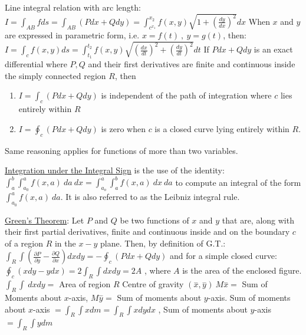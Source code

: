 \documentclass[12pt]{article}
\begin{document}
\begin{flushleft}
	\textbullet \quad Line integral relation with arc length: \linebreak 
	$\displaystyle I = \int_{AB} f ds = \int_{AB} (Pdx + Qdy) = \int_{c^{x_1}}^{x_2} f(x,y) \sqrt{1+ \left( \frac{dy}{dx} \right)^2} dx$ \linebreak 
	\textbullet \quad When $x$ and $y$ are expressed in parametric form, i.e. $x=f(t) \ , \ y=g(t)$, then: $\displaystyle I = \int_c f(x,y) ds = \int_{t_1}^{t_2} f(x,y) \sqrt{\left( \frac{dx}{dt} \right)^2 + \left( \frac{dy}{dt} \right)^2} dt $ \linebreak 
	\textbullet \quad If $Pdx + Qdy$ is an exact differential where $P,Q$ and their first derivatives are finite and continuous inside the simply connected region $R$, then  
	\begin{enumerate}
	\item $\displaystyle I = \int_c \left( Pdx + Qdy \right)$ is independent of the path of integration where $c$ lies entirely within $R$ 
	\item $\displaystyle I = \oint_c \left( Pdx + Qdy \right) $ is zero when $c$ is a closed curve lying entirely within $R$. 
	\end{enumerate} 
	Same reasoning applies for functions of more than two variables. \linebreak 
	
	\textbullet \quad \uline{Integration under the Integral Sign} is the use of the identity: \linebreak 
	$\displaystyle \int_a^b \int_{a_0}^a f(x,a) \ da \ dx = \int_{a_o}^a \int_a^b f(x,a) \ dx \ da $ to compute an integral of the form $\displaystyle  \int_{a_0}^a f(x,a) \ da $. It is also referred to as the Leibniz integral rule. \linebreak 
	
	\textbullet \quad \uline{Green's Theorem}: Let $P$ and $Q$ be two functions of $x$ and $y$ that are, along with their first partial derivatives, finite and continuous inside and on the boundary $c$ of a region $R$ in the $x-y$ plane. Then, by definition of G.T.: $\displaystyle \int_R \int \left( \frac{\partial P}{\partial y} - \frac{\partial Q}{\partial x} \right) dx dy = - \oint_c \left( P dx + Q dy \right) $ \linebreak 
	and for a simple closed curve: \linebreak 
	$\displaystyle \oint_c \left( xdy -ydx \right) = 2 \int_R \int dx dy = 2A$ , where $A$ is the area of the enclosed figure. \linebreak 
	\textbullet \quad $\displaystyle \int_R \int \ dx dy = $ Area of region $R$ \linebreak 
	\textbullet \quad Centre of gravity $\displaystyle (\overset{-}{x}, \overset{-}{y} ) \: M\overset{-}{x} = $ Sum of Moments about $x$-axis, $\displaystyle M\overset{-}{y} = $ Sum of moments about $y$-axis. \linebreak 
	Sum of moments about $x$-axis $\displaystyle  = \int_R \int xdm = \int_R \int x dy dx$ , \linebreak 
	Sum of moments about $y$-axis $\displaystyle = \int_R \int y dm$ \linebreak 
	\linebreak 
	

\end{flushleft}
\end{document}

